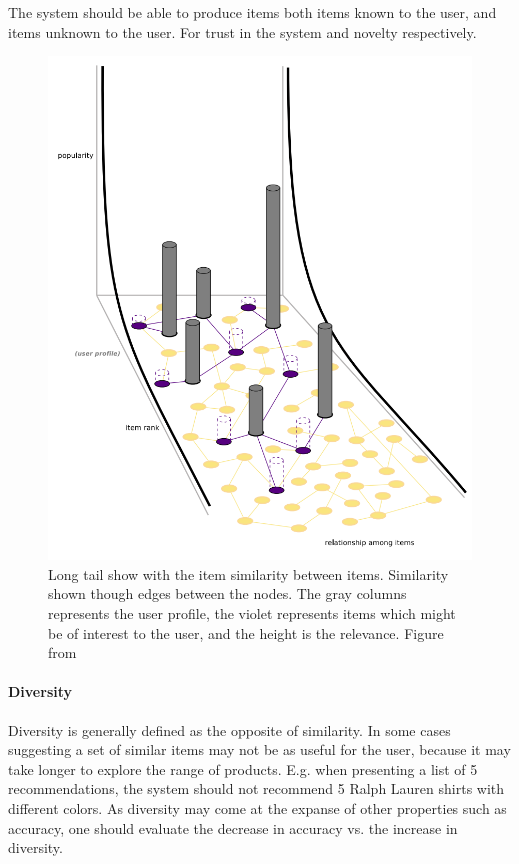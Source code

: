 The system should be able to produce items both items known to the user, and items unknown to the user.
For trust in the system and novelty respectively.

\begin{figure}[H]
    \includegraphics[width=5in]{image/longtailNoveltyFig.png}
    \centering
    \caption[Long tail]{Long tail show with the item similarity between items. Similarity shown though edges between the nodes. The gray columns represents the user profile, the violet represents items which might be of interest to the user, and the height is the relevance. Figure from~\cite{celma2008}}
    \label{figure:longtailNovelty}
\end{figure}

\paragraph{Diversity}
Diversity is generally defined as the opposite of similarity. In some cases suggesting a set of similar items may not be as useful for the user, because it may take longer to explore the range of products. E.g. when presenting a list of 5 recommendations, the system should not recommend 5 Ralph Lauren shirts with different colors. As diversity may come at the expanse of other properties such as accuracy, one should evaluate the decrease in accuracy vs. the increase in diversity.

